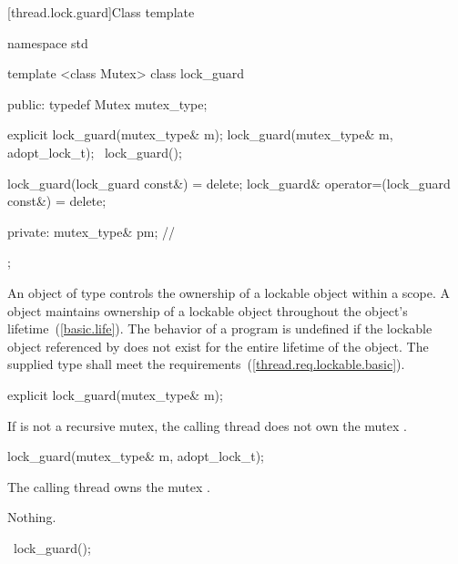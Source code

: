 [thread.lock.guard]{Class template }

\begin{codeblock}
namespace std {
  template <class Mutex>
  class lock_guard {
  public:
    typedef Mutex mutex_type;

    explicit lock_guard(mutex_type& m);
    lock_guard(mutex_type& m, adopt_lock_t);
    ~lock_guard();

    lock_guard(lock_guard const&) = delete;
    lock_guard& operator=(lock_guard const&) = delete;

  private:
    mutex_type& pm; // \expos
  };
}
\end{codeblock}

\pnum
An object of type  controls the ownership of a lockable object
within a scope. A  object maintains ownership of a lockable
object throughout the  object's lifetime~(\ref{basic.life}).
The behavior of a program is undefined if the lockable object referenced by
 does not exist for the entire lifetime of the 
object. The supplied  type shall meet the 
requirements~(\ref{thread.req.lockable.basic}).

%
\begin{itemdecl}
explicit lock_guard(mutex_type& m);
\end{itemdecl}

\begin{itemdescr}
\pnum
\precondition If  is not a recursive mutex, the calling thread does not own
the mutex .

\pnum
\effects {}

\pnum
\postcondition {}
\end{itemdescr}

%
\begin{itemdecl}
lock_guard(mutex_type& m, adopt_lock_t);
\end{itemdecl}

\begin{itemdescr}
\pnum
\precondition The calling thread owns the mutex .

\pnum
\postcondition {}

\pnum
\throws Nothing.
\end{itemdescr}

%
\begin{itemdecl}
~lock_guard();
\end{itemdecl}

